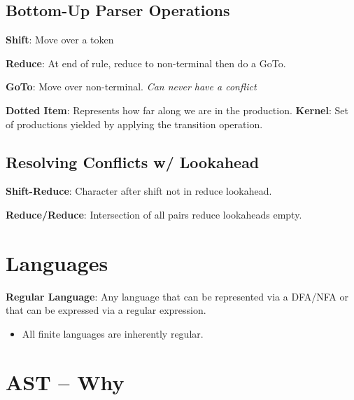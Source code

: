 \documentclass[10pt,twocolumn]{report}
\begin{document}
\subsection*{Bottom-Up Parser Operations}

\textbf{Shift}: Move over a token

\textbf{Reduce}: At end of rule, reduce to non-terminal then do a GoTo.

\textbf{GoTo}: Move over non-terminal. \textit{Can never have a conflict}

\textbf{Dotted Item}: Represents how far along we are in the production. \textbf{Kernel}: Set of productions yielded by applying the transition operation.

\subsection*{Resolving Conflicts w/ Lookahead}
\textbf{Shift-Reduce}: Character after shift not in reduce lookahead.

\textbf{Reduce/Reduce}: Intersection of all pairs reduce lookaheads empty.

\section*{Languages}

\noindent
\textbf{Regular Language}: Any language that can be represented via a DFA/NFA or that can be expressed via a regular expression.
\begin{itemize}
  \item All finite languages are inherently regular.
\end{itemize}

\section{AST -- Why}
\end{document}
